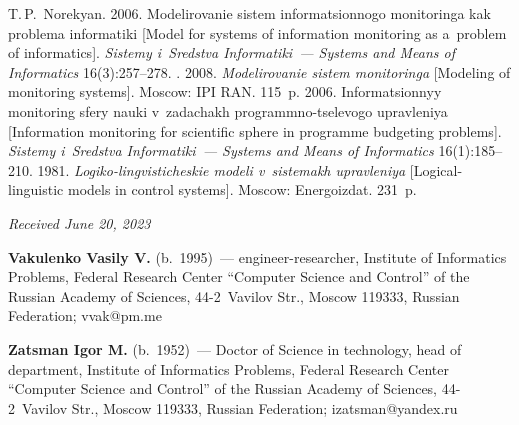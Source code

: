 \begin{multicols}{2}
{{\begin{thebibliography}{99}
{T.\,P.~No\-re\-kyan.} 2006. Mo\-de\-li\-ro\-va\-nie sis\-tem in\-for\-ma\-tsi\-on\-no\-go mo\-ni\-to\-rin\-ga 
kak prob\-le\-ma in\-for\-ma\-ti\-ki [Model for systems of information monitoring as a~problem of 
informatics]. \textit{Sis\-te\-my i~Sredstva Informatiki~--- Systems and Means of Informatics}  
16(3):257--278.
. 2008. \textit{Mo\-de\-li\-ro\-va\-nie 
sis\-tem mo\-ni\-to\-rin\-ga} [Modeling of monitoring systems]. Moscow: IPI RAN. 115~p.
 2006. In\-for\-ma\-tsi\-on\-nyy mo\-ni\-to\-ring sfe\-ry 
nau\-ki v~za\-da\-chakh programmno-tselevogo uprav\-le\-niya [Information monitoring for scientific 
sphere in programme budgeting problems]. \textit{Sis\-te\-my i~Sredstva Informatiki~--- Systems and 
Means of Informatics} 16(1):185--210.
 1981. \textit{Logiko-lingvisticheskie mo\-de\-li v~sis\-te\-makh  
uprav\-le\-niya} [Logical-linguistic models in control systems]. Moscow: Energoizdat. 231~p.

\end{thebibliography}

 }
 }

\end{multicols}

\vspace*{-7pt}

\hfill{\small\textit{Received June 20, 2023}} 

\vspace*{-20pt}

\Contr


\vspace*{-2pt}

\noindent
\textbf{Vakulenko Vasily V.} (b.\ 1995)~--- engineer-researcher, Institute of Informatics Problems, 
Federal Research Center ``Computer Science and Control'' of the Russian Academy of Sciences,  
44-2~Vavilov Str., Moscow 119333, Russian Federation; \mbox{vvak@pm.me}

\vspace*{3pt}

\noindent
\textbf{Zatsman Igor M.} (b.\ 1952)~--- Doctor of Science in technology, head of department, 
Institute of Informatics Problems, Federal Research Center ``Computer Science and Control'' of the 
Russian Academy of Sciences, 44-2~Vavilov Str., Moscow 119333, Russian Federation; 
\mbox{izatsman@yandex.ru}



\label{end\stat}

\renewcommand{\bibname}{\protect\rm Литература} 
